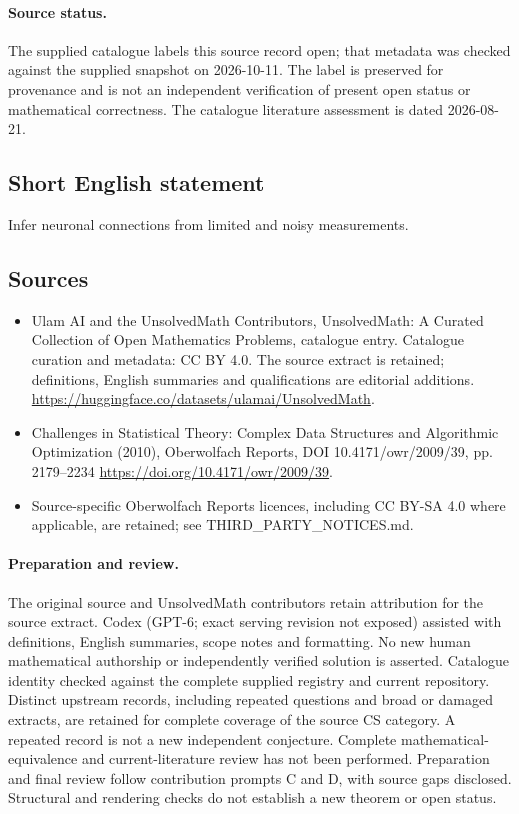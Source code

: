 \documentclass[11pt]{article}
\begin{document}
\paragraph{Source status.}
The supplied catalogue labels this source record open; that metadata was checked against the supplied snapshot on 2026-10-11. The label is preserved for provenance and is not an independent verification of present open status or mathematical correctness. The catalogue literature assessment is dated 2026-08-21.
\subsection{Short English statement}
Infer neuronal connections from limited and noisy measurements.
\subsection{Sources}
\begin{itemize}
\item[S1] Ulam AI and the UnsolvedMath Contributors, UnsolvedMath: A Curated Collection of Open Mathematics Problems, catalogue entry. Catalogue curation and metadata: CC BY 4.0. The source extract is retained; definitions, English summaries and qualifications are editorial additions.
\url{https://huggingface.co/datasets/ulamai/UnsolvedMath}.
\item[S2] Challenges in Statistical Theory: Complex Data Structures and Algorithmic Optimization (2010), Oberwolfach Reports, DOI 10.4171/owr/2009/39, pp. 2179--2234
\url{https://doi.org/10.4171/owr/2009/39}.
\item Source-specific Oberwolfach Reports licences, including CC BY-SA 4.0 where applicable, are retained; see THIRD\_PARTY\_NOTICES.md.
\end{itemize}
\paragraph{Preparation and review.}
The original source and UnsolvedMath contributors retain attribution for the source extract. Codex (GPT-6; exact serving revision not exposed) assisted with definitions, English summaries, scope notes and formatting. No new human mathematical authorship or independently verified solution is asserted. Catalogue identity checked against the complete supplied registry and current repository. Distinct upstream records, including repeated questions and broad or damaged extracts, are retained for complete coverage of the source CS category. A repeated record is not a new independent conjecture. Complete mathematical-equivalence and current-literature review has not been performed. Preparation and final review follow contribution prompts C and D, with source gaps disclosed. Structural and rendering checks do not establish a new theorem or open status.
\label{end:statement}
\end{document}
